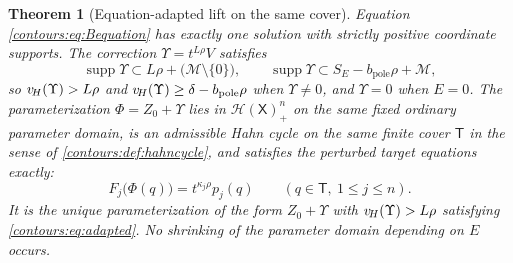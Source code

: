 \documentclass[11pt,letterpaper]{article}
\newtheorem{theorem}{Theorem}[section]
\theoremstyle{definition}
\theoremstyle{remark}
\newcommand{\HH}{\mathcal H}\newcommand{\A}{\mathscr A}\newcommand{\OO}{\mathcal O}
\newcommand{\supp}{\operatorname{supp}}\newcommand{\Res}{\operatorname{Res}}
\numberwithin{equation}{section}
\begin{document}
\begin{theorem}[Equation-adapted lift on the same cover]
\label{contours:thm:adaptedlift}
Equation \eqref{contours:eq:Bequation} has exactly one solution with strictly
positive coordinate supports. The correction $\Upsilon=t^{L\rho}V$ satisfies
\begin{equation}\label{contours:eq:Upsilonsupport}
  \supp\Upsilon\subset L\rho+\bigl(\mathcal M\setminus\{0\}\bigr),
  \qquad
  \supp\Upsilon\subset S_E-b_{\mathrm{pole}}\rho+\mathcal M ,
\end{equation}
so $v_{\!H}(\Upsilon)>L\rho$ and $v_{\!H}(\Upsilon)\ge\delta-b_{\mathrm{pole}}\rho$ when
$\Upsilon\ne0$, and $\Upsilon=0$ when $E=0$. The parameterization
$\Phi=Z_0+\Upsilon$ lies in $\HH(\mathsf X)_+^n$ on the \emph{same} fixed
ordinary parameter domain, is an admissible Hahn cycle on the same finite cover
$\mathsf T$ in the sense of \cref{contours:def:hahncycle}, and satisfies the
perturbed target equations exactly:
\begin{equation}\label{contours:eq:adapted}
  F_j\bigl(\Phi(q)\bigr)=t^{\kappa_j\rho}p_j(q)
  \qquad (q\in\mathsf T,\ 1\le j\le n).
\end{equation}
It is the unique parameterization of the form $Z_0+\Upsilon$ with
$v_{\!H}(\Upsilon)>L\rho$ satisfying \eqref{contours:eq:adapted}. No shrinking of the
parameter domain depending on $E$ occurs.
\end{theorem}
\end{document}
